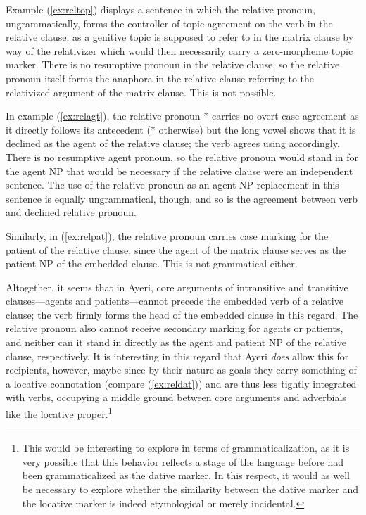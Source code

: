 Example (\ref{ex:reltop}) displays a sentence in which the relative pronoun, 
ungrammatically, forms the controller of topic agreement on the verb in the 
relative clause:  as a genitive topic is supposed to refer to 
 in the matrix clause by way of the relativizer 
 which would then necessarily carry a zero-morpheme topic 
marker. There is no resumptive pronoun in the relative clause, so the relative 
pronoun itself forms the anaphora in the relative clause referring to the 
relativized argument of the matrix clause. This is not possible.

In example (\ref{ex:relagt}), the relative pronoun * carries
no overt case agreement as it directly follows its antecedent
(* otherwise) but the long vowel shows that it is declined
as the agent of the relative clause; the verb agrees using 
accordingly. There is no resumptive agent pronoun, so the relative pronoun
would stand in for the agent NP that would be necessary if the relative clause
were an independent sentence. The use of the relative pronoun as an agent-NP
replacement in this sentence is equally ungrammatical, though, and so is the
agreement between verb and declined relative pronoun.

Similarly, in (\ref{ex:relpat}), the relative pronoun carries case marking for
the patient of the relative clause, since the agent of the matrix clause serves
as the patient NP of the embedded clause. This is not grammatical either.

Altogether, it seems that in Ayeri, core arguments of intransitive and
transitive clauses---agents and patients---cannot precede the embedded verb of
a relative clause; the verb firmly forms the head of the embedded clause in
this regard. The relative pronoun also cannot receive secondary marking for
agents or patients, and neither can it stand in directly as the agent and
patient NP of the relative clause, respectively. It is interesting in this
regard that Ayeri \emph{does} allow this for recipients, however, maybe since
by their nature as goals they carry something of a locative connotation
(compare (\ref{ex:reldat})) and are thus less tightly integrated with verbs,
occupying a middle ground between core arguments and adverbials like the
locative proper.\footnote{This would be interesting to explore in terms of
grammaticalization, as it is very possible that this behavior reflects a stage
of the language before  had been grammaticalized as the dative
marker. In this respect, it would as well be necessary to explore whether the
similarity between the dative marker  and the locative marker
 is indeed etymological or merely incidental.}


